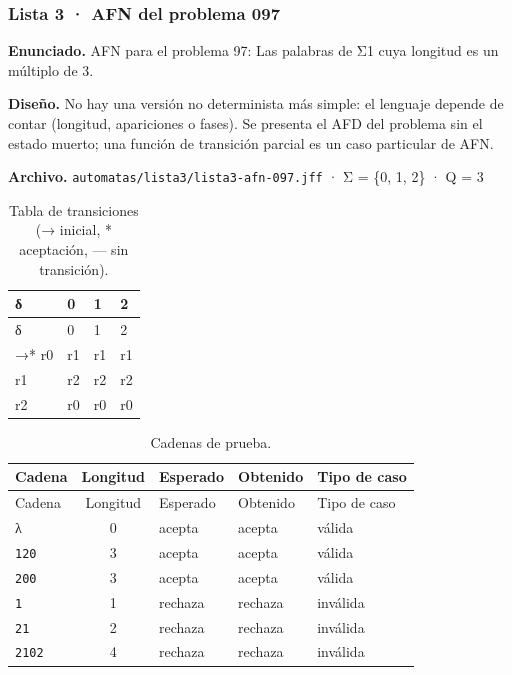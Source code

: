 
\hypertarget{lista-3-afn-del-problema-097}{%
\subsubsection{Lista 3 · AFN del problema 097}\label{lista-3-afn-del-problema-097}}

\textbf{Enunciado.} AFN para el problema 97: Las palabras de Σ1 cuya longitud es un múltiplo de 3.

\textbf{Diseño.} No hay una versión no determinista más simple: el lenguaje depende de contar (longitud, apariciones o fases). Se presenta el AFD del problema sin el estado muerto; una función de transición parcial es un caso particular de AFN.

\textbf{Archivo.} \texttt{automatas/lista3/lista3-afn-097.jff} · Σ = \{0, 1, 2\} · \textbar Q\textbar{} = 3

\begin{longtable}[]{@{}llll@{}}
\caption{Tabla de transiciones (→ inicial, * aceptación, --- sin transición).}\tabularnewline
\toprule\noalign{}
δ & 0 & 1 & 2 \\
\midrule\noalign{}
\endfirsthead
\toprule\noalign{}
δ & 0 & 1 & 2 \\
\midrule\noalign{}
\endhead
\bottomrule\noalign{}
\endlastfoot
→* r0 & r1 & r1 & r1 \\
r1 & r2 & r2 & r2 \\
r2 & r0 & r0 & r0 \\
\end{longtable}

\begin{longtable}[]{@{}lclll@{}}
\caption{Cadenas de prueba.}\tabularnewline
\toprule\noalign{}
Cadena & Longitud & Esperado & Obtenido & Tipo de caso \\
\midrule\noalign{}
\endfirsthead
\toprule\noalign{}
Cadena & Longitud & Esperado & Obtenido & Tipo de caso \\
\midrule\noalign{}
\endhead
\bottomrule\noalign{}
\endlastfoot
λ & 0 & acepta & acepta & válida \\
\texttt{120} & 3 & acepta & acepta & válida \\
\texttt{200} & 3 & acepta & acepta & válida \\
\texttt{1} & 1 & rechaza & rechaza & inválida \\
\texttt{21} & 2 & rechaza & rechaza & inválida \\
\texttt{2102} & 4 & rechaza & rechaza & inválida \\
\end{longtable}

